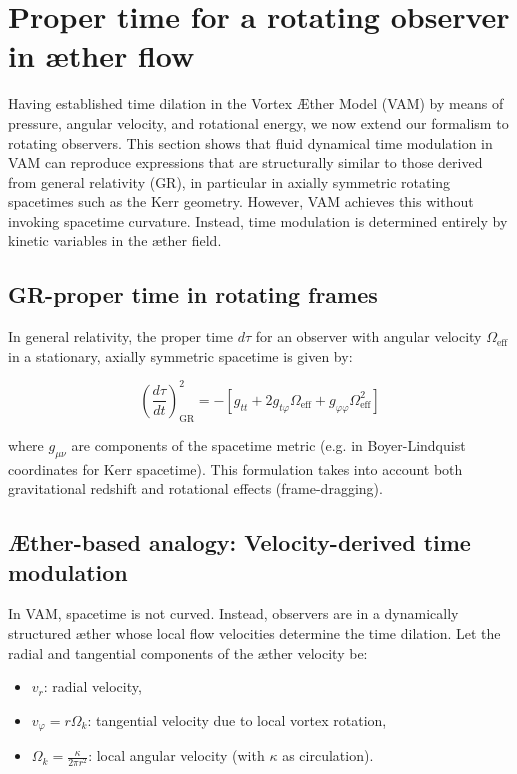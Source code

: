 \section{Proper time for a rotating observer in æther flow}

Having established time dilation in the Vortex Æther Model (VAM) by means of pressure, angular velocity, and rotational energy, we now extend our formalism to rotating observers. This section shows that fluid dynamical time modulation in VAM can reproduce expressions that are structurally similar to those derived from general relativity (GR), in particular in axially symmetric rotating spacetimes such as the Kerr geometry. However, VAM achieves this without invoking spacetime curvature. Instead, time modulation is determined entirely by kinetic variables in the æther field.

\subsection{GR-proper time in rotating frames}

In general relativity, the proper time \(d\tau\) for an observer with angular velocity \(\Omega_{\text{eff}}\) in a stationary, axially symmetric spacetime is given by:

\begin{equation}
 \left( \frac{d\tau}{dt} \right)^2_{\text{GR}} = -\left[ g_{tt} + 2g_{t\varphi} \Omega_{\text{eff}} + g_{\varphi\varphi} \Omega_{\text{eff}}^2 \right]
 \label{eq:GR_proper_time}
\end{equation}

where \(g_{\mu\nu}\) are components of the spacetime metric (e.g. in Boyer-Lindquist coordinates for Kerr spacetime). This formulation takes into account both gravitational redshift and rotational effects (frame-dragging).

\subsection{Æther-based analogy: Velocity-derived time modulation}

In VAM, spacetime is not curved. Instead, observers are in a dynamically structured æther whose local flow velocities determine the time dilation. Let the radial and tangential components of the æther velocity be:

\begin{itemize}
 \item \(v_r\): radial velocity,
 \item \(v_\varphi = r\Omega_k\): tangential velocity due to local vortex rotation,
 \item \(\Omega_k = \frac{\kappa}{2\pi r^2}\): local angular velocity (with \(\kappa\) as circulation).
\end{itemize}


